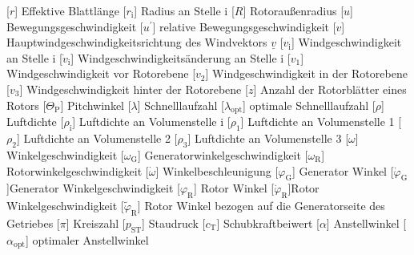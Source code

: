 \documentclass[
	pagesize,
	fontsize=12pt,
	paper=a4,
	oneside,
    reqno
]{scrartcl}
\numberwithin{equation}{section} %
\numberwithin{table}{section} %
\numberwithin{figure}{section} %
\begin{document}
\begin{acronym}[Symbols]
            [$r$]                       {Effektive Blattlänge}
           [$r_{\mathrm{i}}$]          {Radius an Stelle i}
            [$R$]                       {Rotoraußenradius}
            [$u$]                       {Bewegungsgeschwindigkeit}
           [$u^{'}$]                   {relative Bewegungsgeschwindigkeit}
            [$v$]                       {Hauptwindgeschwindigkeitsrichtung des Windvektors $\underline v$}
           [$v_{\mathrm{i}}$]          {Windgeschwindigkeit an Stelle i}
        [$\dot{v}_{\mathrm{i}}$]    {Windgeschwindigkeitsänderung an Stelle i}
           [$v_{\mathrm{1}}$]          {Windgeschwindigkeit vor Rotorebene}
           [$v_{\mathrm{2}}$]          {Windgeschwindigkeit in der Rotorebene}
           [$v_{\mathrm{3}}$]          {Windgeschwindigkeit hinter der Rotorebene}
            [$z$]                       {Anzahl der Rotorblätter eines Rotors}
       [$\Theta_{\mathrm{P}}$]     {Pitchwinkel}
       [$\lambda$]                 {Schnelllaufzahl}
    [$\lambda_{\mathrm{opt}}$]  {optimale Schnelllaufzahl}
          [$\rho$]                    {Luftdichte}
         [$\rho_{\mathrm{i}}$]       {Luftdichte an Volumenstelle i}
         [$\rho_{\mathrm{1}}$]       {Luftdichte an Volumenstelle 1}
         [$\rho_{\mathrm{2}}$]       {Luftdichte an Volumenstelle 2}
         [$\rho_{\mathrm{3}}$]       {Luftdichte an Volumenstelle 3}
        [$\omega$]                  {Winkelgeschwindigkeit}
       [$\omega_{\mathrm{G}}$]     {Generatorwinkelgeschwindigkeit}
       [$\omega_{\mathrm{R}}$]     {Ro\-tor\-win\-kel\-ge\-schwin\-dig\-keit}
     [$\dot \omega$]             {Winkelbeschleunigung}
         [$\varphi_{\mathrm{G}}$]    {Generator Winkel}
      [$\dot\varphi_{\mathrm{G}}$]{Generator Winkelgeschwindigkeit}
         [$\varphi_{\mathrm{R}}$]    {Rotor Winkel}
      [$\dot\varphi_{\mathrm{R}}$]{Rotor Winkelgeschwindigkeit}
    [$\tilde{\varphi}_{\mathrm{R}}$]    {Rotor Winkel bezogen auf die Generatorseite des Getriebes}
           [$\pi$]                     {Kreiszahl}
          [$p_{\mathrm{ST}}$]         {Staudruck}
           [$c_{\mathrm{T}}$]          {Schubkraftbeiwert}
        [$\alpha$]                  {Anstellwinkel}
     [$\alpha_{\mathrm{opt}}$]   {optimaler Anstellwinkel}

\end{acronym}
\end{document}
